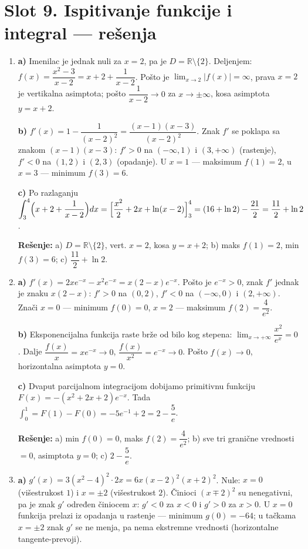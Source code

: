 \section*{Slot 9. Ispitivanje funkcije i integral — rešenja}
\begin{enumerate}[label=\arabic*.]
  \item \textbf{a)} Imenilac je jednak nuli za $x=2$, pa je $D=\mathbb{R}\setminus\{2\}$. Deljenjem: $f(x)=\dfrac{x^2-3}{x-2}=x+2+\dfrac{1}{x-2}$. Pošto je $\lim_{x\to 2}|f(x)|=\infty$, prava $x=2$ je vertikalna asimptota; pošto $\dfrac{1}{x-2}\to 0$ za $x\to\pm\infty$, kosa asimptota $y=x+2$.

  \textbf{b)} $f'(x)=1-\dfrac{1}{(x-2)^2}=\dfrac{(x-1)(x-3)}{(x-2)^2}$. Znak $f'$ se poklapa sa znakom $(x-1)(x-3)$: $f'>0$ na $(-\infty,1)$ i $(3,+\infty)$ (rastenje), $f'<0$ na $(1,2)$ i $(2,3)$ (opadanje). U $x=1$ — maksimum $f(1)=2$, u $x=3$ — minimum $f(3)=6$.

  \textbf{c)} Po razlaganju $\displaystyle\int_{3}^{4}\Bigl(x+2+\frac{1}{x-2}\Bigr)dx=\Bigl[\frac{x^2}{2}+2x+\ln(x-2)\Bigr]_{3}^{4}=(16+\ln 2)-\frac{21}{2}=\frac{11}{2}+\ln 2$.

  \textbf{Rešenje:} a) $D=\mathbb{R}\setminus\{2\}$, vert. $x=2$, kosa $y=x+2$; b) maks $f(1)=2$, min $f(3)=6$; c) $\dfrac{11}{2}+\ln 2$.

  \item \textbf{a)} $f'(x)=2x e^{-x}-x^2 e^{-x}=x(2-x)e^{-x}$. Pošto je $e^{-x}>0$, znak $f'$ jednak je znaku $x(2-x)$: $f'>0$ na $(0,2)$, $f'<0$ na $(-\infty,0)$ i $(2,+\infty)$. Znači $x=0$ — minimum $f(0)=0$, $x=2$ — maksimum $f(2)=\dfrac{4}{e^2}$.

  \textbf{b)} Eksponencijalna funkcija raste brže od bilo kog stepena: $\lim_{x\to+\infty}\dfrac{x^2}{e^x}=0$. Dalje $\dfrac{f(x)}{x}=x e^{-x}\to 0$, $\dfrac{f(x)}{x^2}=e^{-x}\to 0$. Pošto $f(x)\to 0$, horizontalna asimptota $y=0$.

  \textbf{c)} Dvaput parcijalnom integracijom dobijamo primitivnu funkciju $F(x)=-(x^2+2x+2)e^{-x}$. Tada $\displaystyle\int_{0}^{1}=F(1)-F(0)=-5e^{-1}+2=2-\dfrac{5}{e}$.

  \textbf{Rešenje:} a) min $f(0)=0$, maks $f(2)=\dfrac{4}{e^2}$; b) sve tri granične vrednosti $=0$, asimptota $y=0$; c) $2-\dfrac{5}{e}$.

  \item \textbf{a)} $g'(x)=3(x^2-4)^2\cdot 2x=6x(x-2)^2(x+2)^2$. Nule: $x=0$ (višestrukost $1$) i $x=\pm 2$ (višestrukost $2$). Činioci $(x\mp 2)^2$ su nenegativni, pa je znak $g'$ određen činiocem $x$: $g'<0$ za $x<0$ i $g'>0$ za $x>0$. U $x=0$ funkcija prelazi iz opadanja u rastenje — minimum $g(0)=-64$; u tačkama $x=\pm 2$ znak $g'$ se ne menja, pa nema ekstremne vrednosti (horizontalne tangente-prevoji).


\end{enumerate}
